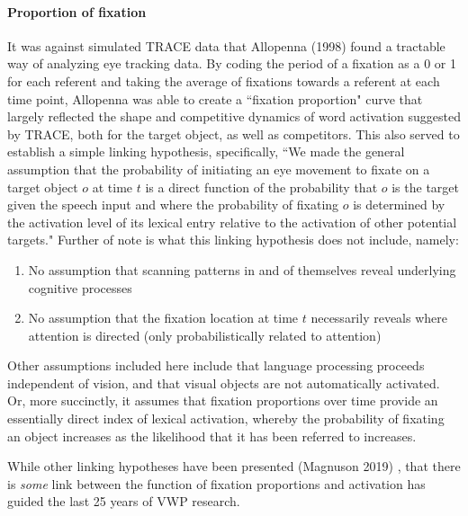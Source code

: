 \paragraph{Proportion of fixation} It was against simulated TRACE data that Allopenna (1998) found a tractable way of analyzing eye tracking data. By coding the period of a fixation as a 0 or 1 for each referent and taking the average of fixations towards a referent at each time point, Allopenna was able to create a ``fixation proportion" curve that largely reflected the shape and competitive dynamics of word activation suggested by TRACE, both for the target object, as well as competitors. This also served to establish a simple linking hypothesis, specifically, ``We made the general assumption that the probability of initiating an eye movement to fixate on a target object $o$ at time $t$ is a direct function of the probability that $o$ is the target given the speech input and where the probability of fixating $o$ is determined by the activation level of its lexical entry relative to the activation of other potential targets." Further of note is what this linking hypothesis does not include, namely:


\begin{enumerate}
\item No assumption that scanning patterns in and of themselves reveal underlying cognitive processes
\item No assumption that the fixation location at time $t$ necessarily reveals where attention is directed (only probabilistically related to attention)
\end{enumerate}


Other assumptions included here include that language processing proceeds independent of vision, and that visual objects are not automatically activated. Or, more succinctly, it assumes that fixation proportions over time provide an essentially direct index of lexical activation, whereby the probability of fixating an object increases as the likelihood that it has been referred to increases.


While other linking hypotheses have been presented (Magnuson 2019) \cite{Magnuson2019}, that there is \textit{some} link between the function of fixation proportions and activation has guided the last 25 years of VWP research.




